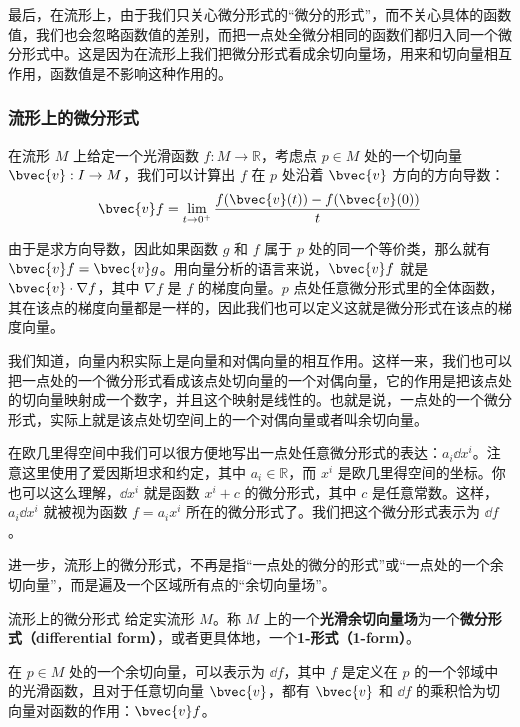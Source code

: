 最后，在流形上，由于我们只关心微分形式的“微分的形式”，而不关心具体的函数值，我们也会忽略函数值的差别，而把一点处全微分相同的函数们都归入同一个微分形式中。这是因为在流形上我们把微分形式看成余切向量场，用来和切向量相互作用，函数值是不影响这种作用的。

\subsubsection{流形上的微分形式}

在流形 $M$ 上给定一个光滑函数 $f:M\rightarrow \mathbb{R}$，考虑点 $p\in M$ 处的一个切向量 $\bvec{v}:I\rightarrow M$，我们可以计算出 $f$ 在 $p$ 处沿着 $\bvec{v}$ 方向的方向导数：
\begin{equation}
\bvec{v}f=\lim\limits_{t\rightarrow 0^+}\frac{f(\bvec{v}(t))-f(\bvec{v}(0))}{t}
\end{equation}

由于是求方向导数，因此如果函数 $g$ 和 $f$ 属于 $p$ 处的同一个等价类，那么就有 $\bvec{v}f=\bvec{v}g$。用向量分析的语言来说，$\bvec{v}f$ 就是 $\bvec{v}\cdot\nabla f$，其中 $\nabla f$ 是 $f$ 的梯度向量。$p$ 点处任意微分形式里的全体函数，其在该点的梯度向量都是一样的，因此我们也可以定义这就是微分形式在该点的梯度向量。

我们知道，向量内积实际上是向量和对偶向量的相互作用。这样一来，我们也可以把一点处的一个微分形式看成该点处切向量的一个对偶向量，它的作用是把该点处的切向量映射成一个数字，并且这个映射是线性的。也就是说，一点处的一个微分形式，实际上就是该点处切空间上的一个对偶向量或者叫余切向量。

在欧几里得空间中我们可以很方便地写出一点处任意微分形式的表达：$a_i\dd x^i$。注意这里使用了爱因斯坦求和约定，其中 $a_i\in\mathbb{R}$，而 $x^i$ 是欧几里得空间的坐标。你也可以这么理解，$\dd x^i$ 就是函数 $x^i+c$ 的微分形式，其中 $c$ 是任意常数。这样，$a_i\dd x^i$ 就被视为函数 $f=a_ix^i$ 所在的微分形式了。我们把这个微分形式表示为 $\dd f$。

进一步，流形上的微分形式，不再是指“一点处的微分的形式”或“一点处的一个余切向量”，而是遍及一个区域所有点的“余切向量场”。

\begin{definition}{流形上的微分形式}
给定实流形 $M$。称 $M$ 上的一个\textbf{光滑余切向量场}为一个\textbf{微分形式（differential form）}，或者更具体地，一个\textbf{1-形式（1-form）}。

在 $p\in M$ 处的一个余切向量，可以表示为 $\dd f$，其中 $f$ 是定义在 $p$ 的一个邻域中的光滑函数，且对于任意切向量 $\bvec{v}$，都有 $\bvec{v}$ 和 $\dd f$ 的乘积恰为切向量对函数的作用：$\bvec{v}f$。
\end{definition}

